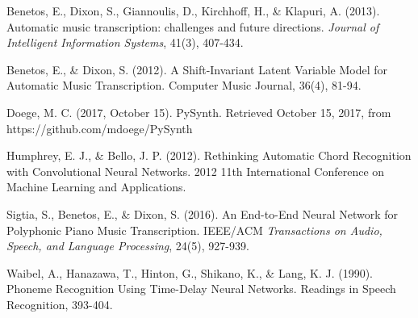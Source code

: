 \documentclass[conference]{IEEEtran}
\begin{document}
\begin{thebibliography}{99} %

Benetos, E., Dixon, S., Giannoulis, D., Kirchhoff, H., \& Klapuri, A. (2013). Automatic music transcription: challenges and future directions. \textit{Journal of Intelligent Information Systems}, 41(3), 407-434.

Benetos, E., \& Dixon, S. (2012). A Shift-Invariant Latent Variable Model for Automatic Music Transcription. Computer Music Journal, 36(4), 81-94.

Doege, M. C. (2017, October 15). PySynth. Retrieved October 15, 2017, from https://github.com/mdoege/PySynth

Humphrey, E. J., \& Bello, J. P. (2012). Rethinking Automatic Chord Recognition with Convolutional Neural Networks. 2012 11th International Conference on Machine Learning and Applications. 

Sigtia, S., Benetos, E., \& Dixon, S. (2016). An End-to-End Neural Network for Polyphonic Piano Music Transcription. IEEE/ACM \textit{Transactions on Audio, Speech, and Language Processing}, 24(5), 927-939.

Waibel, A., Hanazawa, T., Hinton, G., Shikano, K., \& Lang, K. J. (1990). Phoneme Recognition Using Time-Delay Neural Networks. Readings in Speech Recognition, 393-404.
 
\end{thebibliography}
\end{document}
